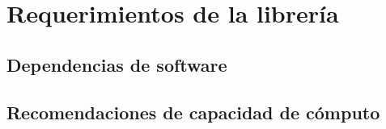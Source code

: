\section{Requerimientos de la librería}


\subsection{Dependencias de software}

\subsection{Recomendaciones de capacidad de cómputo}